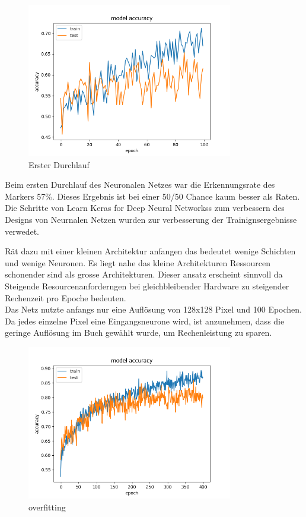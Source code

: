 \documentclass[conference]{IEEEtran}
\begin{document}
	
	\begin{figure}[!h]
		\centering
		\includegraphics[width=9cm]{img/160x120:100@32_accuracy.png}
		\caption{Erster Durchlauf}
		\label{Initiales Ergebnis}
	\end{figure}
	Beim ersten Durchlauf des Neuronalen Netzes war die Erkennungsrate des Markers 57\%. Dieses Ergebnis ist bei einer 50/50 Chance kaum besser als Raten.\\
	
	Die Schritte von  \glqq Learn Keras for Deep Neural Networkss\grqq \cite{moolayil2019learn} zum verbessern des Designs von Neurnalen Netzen wurden zur verbesserung der Trainignsergebnisse verwedet. 
	
	\cite{moolayil2019learn} Rät dazu mit einer kleinen Architektur anfangen das bedeutet wenige Schichten und wenige Neuronen. Es liegt nahe das kleine Architekturen Ressourcen schonender sind als grosse Architekturen. Dieser ansatz erscheint sinnvoll da Steigende Resourcenanforderngen bei gleichbleibender Hardware zu steigender Rechenzeit pro Epoche bedeuten. \\
	
	Das Netz nutzte anfangs nur eine Auflösung von 128x128 Pixel und 100 Epochen. Da jedes einzelne Pixel eine Eingangsneurone wird, ist anzunehmen, dass die geringe Auflösung im Buch gewählt wurde, um Rechenleistung zu sparen. \\
	
	\begin{figure}[!h]
		\centering
		\includegraphics[width=9cm]{img/213x160:400@32_accuracy.png}
		\caption{overfitting}
		\label{Overfitt }
	\end{figure}
	
\end{document}
